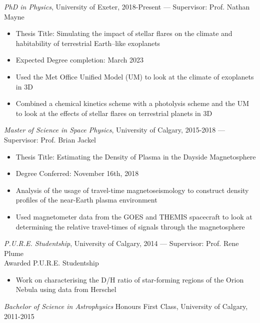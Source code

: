 \documentclass[letter, margin, 10pt]{res} %
\begin{document}
\begin{resume}
{\sl PhD in Physics}, University of Exeter, 2018-Present --- Supervisor: Prof. Nathan Mayne\\
\begin{itemize}[noitemsep,topsep=0pt,parsep=0pt,partopsep=0pt]
\item Thesis Title: Simulating the impact of stellar flares on the climate and habitability of terrestrial Earth--like exoplanets
\item Expected Degree completion: March 2023
\item Used the Met Office Unified Model (UM) to look at the climate of exoplanets in 3D
\item Combined a chemical kinetics scheme with a photolysis scheme and the UM to look at the effects of stellar flares on terrestrial planets in 3D
\end{itemize}
\vspace{-10pt}
{\sl Master of Science in Space Physics}, University of Calgary, 2015-2018 --- Supervisor: Prof. Brian Jackel
\begin{itemize}[noitemsep,topsep=0pt,parsep=0pt,partopsep=0pt]
\item Thesis Title: Estimating the Density of Plasma in the Dayside Magnetosphere
\item Degree Conferred: November 16th, 2018
\item Analysis of the usage of travel-time magnetoseismology to construct density profiles of the near-Earth plasma environment
\item Used magnetometer data from the GOES and THEMIS spacecraft to look at determining the relative travel-times of signals  through the magnetosphere
\end{itemize}
\vspace{-10pt}
{\sl P.U.R.E. Studentship}, University of Calgary, 2014 --- Supervisor: Prof. Rene Plume\\
\null\quad\quad Awarded P.U.R.E. Studentship
\begin{itemize}[noitemsep,topsep=0pt,parsep=0pt,partopsep=0pt]
\item Work on characterising the D/H ratio of star-forming regions of the Orion Nebula using data from Herschel
\end{itemize}
\vspace{-10pt}
{\sl Bachelor of Science in Astrophysics} Honours First Class, University of Calgary, 2011-2015





\end{resume}
\end{document}
